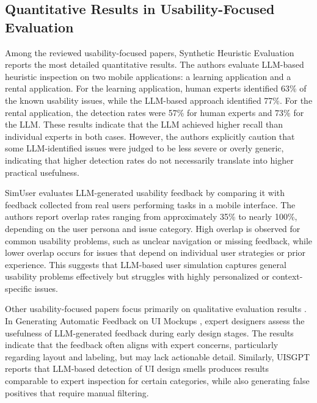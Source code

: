 \documentclass[acmsmall,nonacm]{acmart}
\begin{document}
\subsection{Quantitative Results in Usability-Focused Evaluation}

Among the reviewed usability-focused papers, Synthetic Heuristic Evaluation \cite{zhong2023synthetic_heuristic} reports the most detailed quantitative results. The authors evaluate LLM-based heuristic inspection on two mobile applications: a learning application and a rental application. For the learning application, human experts identified 63\% of the known usability issues, while the LLM-based approach identified 77\%. For the rental application, the detection rates were 57\% for human experts and 73\% for the LLM. These results indicate that the LLM achieved higher recall than individual experts in both cases. However, the authors explicitly caution that some LLM-identified issues were judged to be less severe or overly generic, indicating that higher detection rates do not necessarily translate into higher practical usefulness.

SimUser \cite{xiang2023simuser} evaluates LLM-generated usability feedback by comparing it with feedback collected from real users performing tasks in a mobile interface. The authors report overlap rates ranging from approximately 35\% to nearly 100\%, depending on the user persona and issue category. High overlap is observed for common usability problems, such as unclear navigation or missing feedback, while lower overlap occurs for issues that depend on individual user strategies or prior experience. This suggests that LLM-based user simulation captures general usability problems effectively but struggles with highly personalized or context-specific issues.

Other usability-focused papers focus primarily on qualitative evaluation results \cite{pourasad2024genai_usability,lubos2024usability_recommendations}. In Generating Automatic Feedback on UI Mockups \cite{duan2024ui_mockup_feedback}, expert designers assess the usefulness of LLM-generated feedback during early design stages. The results indicate that the feedback often aligns with expert concerns, particularly regarding layout and labeling, but may lack actionable detail. Similarly, UISGPT \cite{yang2023uisgpt} reports that LLM-based detection of UI design smells produces results comparable to expert inspection for certain categories, while also generating false positives that require manual filtering.
\end{document}
